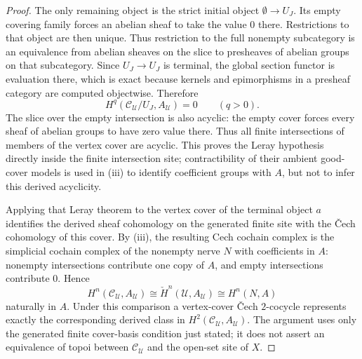 \begin{proof}
The only remaining object is the strict initial object \(\emptyset\to U_J\).
Its empty covering family forces an abelian sheaf to take the value \(0\)
there. Restrictions to that object are then unique. Thus restriction to the
full nonempty subcategory is an equivalence from abelian sheaves on the slice
to presheaves of abelian groups on that subcategory. Since \(U_J\to U_J\) is
terminal, the global section functor is evaluation there, which is exact
because kernels and epimorphisms in a presheaf category are computed
objectwise. Therefore
\[
H^q(\mathcal C_{\mathcal U}/U_J,A_{\mathcal U})=0
\qquad(q>0).
\]
The slice over the empty intersection is also acyclic: the empty cover forces
every sheaf of abelian groups to have zero value there. Thus all finite
intersections of members of the vertex cover are acyclic. This proves the
Leray hypothesis
directly inside the finite intersection site; contractibility of their ambient
good-cover models is used in \textup{(iii)} to identify coefficient
groups with \(A\), but not to infer this derived acyclicity.

Applying that Leray theorem to the vertex cover of the terminal object \(a\)
identifies the derived sheaf cohomology on the generated finite site with the
\v{C}ech cohomology of this cover. By \textup{(iii)}, the resulting Cech
cochain complex is the simplicial cochain complex of the nonempty nerve
\(N\) with coefficients in \(A\): nonempty intersections contribute one copy
of \(A\), and empty intersections contribute \(0\). Hence
\[
H^n(\mathcal C_{\mathcal U},A_{\mathcal U})
\cong \check H^n(\mathcal U,A_{\mathcal U})
\cong H^n(N,A)
\]
naturally in \(A\). Under this comparison a vertex-cover \v{C}ech
\(2\)-cocycle represents exactly the corresponding derived class in
\(H^2(\mathcal C_{\mathcal U},A_{\mathcal U})\). The argument uses only the
generated finite cover-basis condition just stated; it does not assert an
equivalence of topoi between \(\mathcal C_{\mathcal U}\) and the open-set
site of \(X\).


\end{proof}
